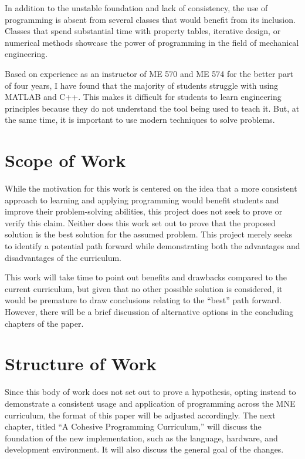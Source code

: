 In addition to the unstable foundation and lack of consistency, the use of programming is 
absent from several classes that would benefit from its inclusion. Classes that spend
substantial time with property tables, iterative design, or numerical methods
showcase the power of programming in the field of mechanical engineering. 

Based on experience as an instructor of ME 570 and ME 574 for the better part of 
four years, I have found that the majority of students struggle with using MATLAB and C++. 
This makes it 
difficult for students to learn engineering principles because they do not understand 
the tool being used to teach it. But, at the same time, it is important to use modern
techniques to solve problems.

\section{Scope of Work}

While the motivation for this work is centered on the idea that a more consistent approach to
learning and applying programming would benefit students and improve their problem-solving
abilities, this project does not seek to prove or verify this claim. Neither does this
work set out to prove that the proposed solution is the best solution for the assumed
problem. This project merely seeks to identify a potential path forward while 
demonstrating both the advantages and disadvantages of the curriculum. 

This work will take time to point out benefits and drawbacks compared to the current 
curriculum, but given that no other possible solution is considered, it would be
premature to draw conclusions relating to the ``best'' path forward. However, there 
will be a brief discussion of alternative options in the concluding chapters of the paper.

\section{Structure of Work}

Since this body of work does not set out to prove a hypothesis, opting instead to demonstrate
a consistent usage and application of programming across the MNE curriculum, the format of
this paper will be adjusted accordingly. The next chapter, titled ``A Cohesive Programming
Curriculum,'' will discuss the foundation of the new implementation, such as the language,
hardware, and development environment. It will also discuss the general goal of the changes.

